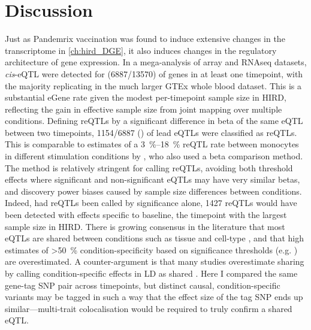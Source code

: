 \section{Discussion}

Just as Pandemrix vaccination was found to induce extensive changes in the transcriptome
in \cref{ch:hird_DGE},
it also induces changes in the regulatory architecture of gene expression.
In a mega-analysis of array and \gls{RNAseq} datasets,
\textit{cis}-\gls{eQTL} were detected for  (\num{6887/13570}) of genes in at least one timepoint,
with the majority replicating in the much larger GTEx whole blood dataset.
This is a substantial eGene rate given the modest per-timepoint sample size in \gls{HIRD}, reflecting the gain in effective sample size from joint mapping over multiple conditions.
Defining \glspl{reQTL} by a significant difference in beta of the same \gls{eQTL} between two timepoints,
\num{1154/6887} () of lead \glspl{eQTL} were classified as \glspl{reQTL}.
This is comparable to estimates of a \SIrange{3}{18}{\%} \gls{reQTL} rate between monocytes in different stimulation conditions by \textcite{kim-hellmuth2017GeneticRegulatoryEffects}, who also used a beta comparison method.
The method is relatively stringent for calling \glspl{reQTL},
avoiding both threshold effects where significant and non-significant \glspl{eQTL} may have very similar betas,
and discovery power biases caused by sample size differences between conditions.
Indeed, had \glspl{reQTL} been called by significance alone, 1427 \glspl{reQTL} would have been detected with effects specific to baseline, the timepoint with the largest sample size in \gls{HIRD}.
There is growing consensus in the literature that most \glspl{eQTL} are shared between conditions such as tissue and cell-type \autocite{ongen2017EstimatingCausalTissues,urbut2018FlexibleStatisticalMethods,kim-hellmuth2020CellTypeSpecific,umans2020WhereAreDiseaseAssociated},
and that high estimates of \SI{>50}{\percent} condition-specificity based on significance thresholds (e.g. \autocite{ackermann2013ImpactNaturalGenetic}) are overestimated.
A counter-argument is that many studies overestimate sharing by calling condition-specific effects in \gls{LD} as shared \autocite{umans2020WhereAreDiseaseAssociated}.
Here I compared the same gene-tag \gls{SNP} pair across timepoints,
but distinct causal, condition-specific variants may be tagged in such a way that the effect size of the tag \gls{SNP} ends up similar---multi-trait colocalisation would be required to truly confirm a shared \gls{eQTL}.

